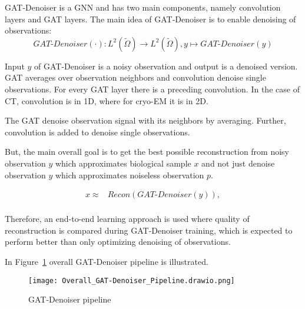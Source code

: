 GAT-Denoiser is a GNN and has two main components, namely convolution layers and GAT layers.
The main idea of GAT-Denoiser is to enable denoising of observations:
\begin{equation}
  \textit{GAT-Denoiser} (\cdot) : L^2(\tilde{\Omega}) \to  L^2(\tilde{\Omega}) , y \mapsto \textit{GAT-Denoiser} (y) 
\end{equation}


Input $y$ of GAT-Denoiser is a noisy observation and output is a denoised version.
GAT averages over observation neighbors and convolution denoise single observations. 
For every GAT layer there is a preceding convolution. 
In the case of CT, convolution is in 1D, where for cryo-EM it is in 2D.

\begin{tcolorbox}[colback=red!5!white,colframe=red!75!black]
  The GAT denoise observation signal with its neighbors by averaging. 
  Further, convolution is added to denoise single observations.
\end{tcolorbox}


But, the main overall goal is to get the best possible reconstruction 
from noisy observation $y$ which approximates biological sample $x$ and 
not just denoise observation $y$ which approximates noiseless observation $p$.


\begin{equation}
  \begin{aligned}
    x \approx   &\textit{Recon} \left( \textit{GAT-Denoiser} \left( y \right) \right), \\
  \end{aligned}
\end{equation}

Therefore, an end-to-end learning approach is used where quality of reconstruction is 
compared during GAT-Denoiser training, which is expected to perform better than 
only optimizing denoising of observations.

In Figure~\ref{fig:overall-concept} overall GAT-Denoiser pipeline is illustrated.

\begin{figure}[H]
  \centering
  \texttt{[image: Overall\_GAT-Denoiser\_Pipeline.drawio.png]}
  \caption{GAT-Denoiser pipeline}
  \label{fig:overall-concept}
\end{figure}


